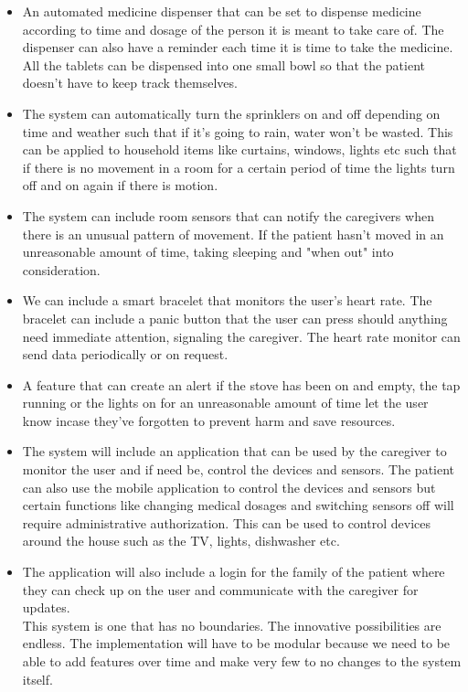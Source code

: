 \documentclass[12pt]{article}
\begin{document}
	\begin{itemize}
		
		\item An automated medicine dispenser that can be set to dispense medicine according to time and dosage of the person it is meant to take care of. The dispenser can also have a reminder each time it is time to take the medicine. All the tablets can be dispensed into one small bowl so that the patient doesn't have to keep track themselves.	
		\item The system can automatically turn the sprinklers on and off depending on time and weather such that if it's going to rain, water won't be wasted. This can be applied to household items like curtains, windows, lights etc such that if there is no movement in a room for a certain period of time the lights turn off and on again if there is motion. 	
		\item The system can include room sensors that can notify the caregivers when there is an unusual pattern of movement. If the patient hasn't moved in an unreasonable amount of time, taking sleeping and "when out" into consideration.	
		\item We can include a smart bracelet that monitors the user's heart rate. The bracelet can include a panic button that the user can press should anything need immediate attention, signaling the caregiver. The heart rate monitor can send data periodically or on request.	
		\item A feature that can create an alert if the stove has been on and empty, the tap running or the lights on for an unreasonable amount of time let the user know incase they've forgotten to prevent harm and save resources.	
		\item The system will include an application that can be used by the caregiver to monitor the user and if need be, control the devices and sensors. The patient can also use the mobile application to control the devices and sensors but certain functions like changing medical dosages and switching sensors off will require administrative authorization. This can be used to control devices around the house such as the TV, lights, dishwasher etc.	
		\item The application will also include a login for the family of the patient where they can check up on the user and communicate with the caregiver for updates.  \\		
		This system is one that has no boundaries. The innovative possibilities are endless. The implementation will have to be modular because we need to be able to add features over time and make very few to no changes to the system itself.
		
	\end{itemize}
\end{document}
